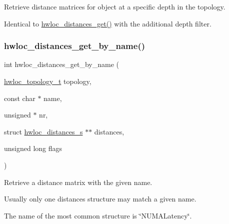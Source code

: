 Retrieve distance matrices for object at a specific depth in the topology. 

Identical to \hyperlink{a00208_ga613e6b2a5d0f06626ee8d0c12fa46691}{hwloc\+\_\+distances\+\_\+get()} with the additional {\ttfamily depth} filter. \mbox{\label{a00208_gaa457f35b8745ca41ec17797c0d7b20f0}} 
\subsubsection{\texorpdfstring{hwloc\+\_\+distances\+\_\+get\+\_\+by\+\_\+name()}{hwloc\_distances\_get\_by\_name()}}
{\footnotesize\ttfamily int hwloc\+\_\+distances\+\_\+get\+\_\+by\+\_\+name (\begin{DoxyParamCaption}\item[{\hyperlink{a00186_ga9d1e76ee15a7dee158b786c30b6a6e38}{hwloc\+\_\+topology\+\_\+t}}]{topology,  }\item[{const char $\ast$}]{name,  }\item[{unsigned $\ast$}]{nr,  }\item[{struct \hyperlink{a00310}{hwloc\+\_\+distances\+\_\+s} $\ast$$\ast$}]{distances,  }\item[{unsigned long}]{flags }\end{DoxyParamCaption})}



Retrieve a distance matrix with the given name. 

Usually only one distances structure may match a given name.

The name of the most common structure is \char`\"{}\+N\+U\+M\+A\+Latency\char`\"{}. \mbox{\label{a00208_gaaa6bfbc20072a4f4de132eec859067f6}} 
